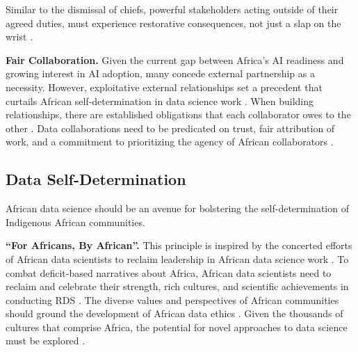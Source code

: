 Similar to the dismissal of chiefs, powerful stakeholders acting outside of their agreed duties, must experience restorative consequences, not just a slap on the wrist \cite{mandaza2004reconciliationzimbabwe, ndjungu2020blood, shilongo2023creativity, mhlambi2023decolonizing, langat2020how, gwagwa2019recommendations, mhlambi2020from, biko2004black, coetzee2004laterMarx}.

\textbf{Fair Collaboration.}
Given the current gap between Africa's AI readiness and growing interest in AI adoption, many concede external partnership as a necessity\cite{eke2023introducing, african_union2024continental}. However, exploitative external relationships set a precedent that curtails African self-determination in data science work \cite{ndjungu2020blood,sinha2023principlesafrofeminist}. When building relationships, there are established obligations that each collaborator owes to the other \cite{coetzee2004particularity, metz2021african}. Data collaborations need to be predicated on trust, fair attribution of work, and a commitment to prioritizing the agency of African collaborators \cite{adelani2022masakhaner,nwankwo2019africa,abebe2021narratives,gwagwa2019recommendations, wareham2021artificial, wiredu2004moralfoundations}. 

\subsection{Data Self-Determination}
\label{sec:Data Self-Determination}
African data science should be an avenue for bolstering the self-determination of Indigenous African communities.

\textbf{``For Africans, By African''.}
\label{sec:fubu} 
This principle is inspired by the concerted efforts of African data scientists to reclaim leadership in African data science work \cite{chan2021limits}.
To combat deficit-based narratives about Africa, African data scientists need to reclaim and celebrate their strength, rich cultures, and scientific achievements in conducting RDS \cite{abebe2021narratives,adelani2022masakhaner,hountondji2004producing, coetzee2004particularity, lauer2017african,gwagwa2019recommendations, carman2023applying}. The diverse values and perspectives of African communities should ground the development of African data ethics \cite{coetzee2004african,segun2021critically, african_union2024continental, ruttkampbloem2023epistemic, gwagwa2022role, dignum2023responsible, olojede2023towards}. 
Given the thousands of cultures that comprise Africa, the potential for novel approaches to data science must be explored \cite{eke2022forgotten,goffi2023teaching,coetzee2004laterMarx, shilongo2023creativity,day2023data,kohnert2022machine}.  

